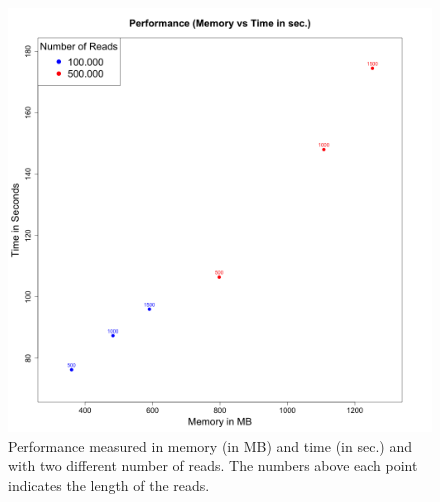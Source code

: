 \documentclass[10pt,a4paper]{article}
\begin{document}
\newpage
\begin{figure}[!ht]
\centering
\label{fig:performance}
\includegraphics[width=\textwidth]{../output/plots/plotPerformance}
\caption{\footnotesize Performance measured in memory (in MB) and time (in sec.) and with two different number of reads. The numbers above each point indicates the length of the reads.}
\end{figure}
\end{document}
